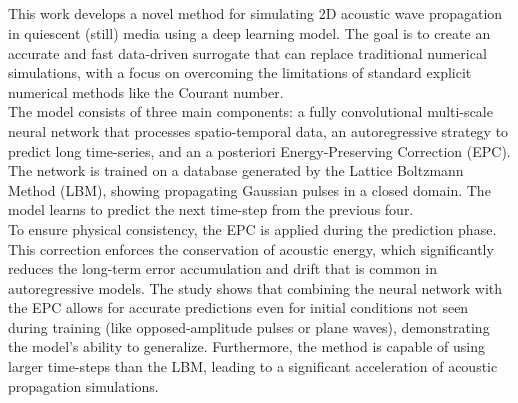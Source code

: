 		\subsection{}
			This work develops a novel method for simulating 2D acoustic wave propagation in quiescent (still) media using a deep learning model. The goal is to create an accurate and fast data-driven surrogate that can replace traditional numerical simulations, with a focus on overcoming the limitations of standard explicit numerical methods like the Courant number.\\
			The model consists of three main components: a fully convolutional multi-scale neural network that processes spatio-temporal data, an autoregressive strategy to predict long time-series, and an a posteriori Energy-Preserving Correction (EPC). The network is trained on a database generated by the Lattice Boltzmann Method (LBM), showing propagating Gaussian pulses in a closed domain. The model learns to predict the next time-step from the previous four.\\
			To ensure physical consistency, the EPC is applied during the prediction phase. This correction enforces the conservation of acoustic energy, which significantly reduces the long-term error accumulation and drift that is common in autoregressive models. The study shows that combining the neural network with the EPC allows for accurate predictions even for initial conditions not seen during training (like opposed-amplitude pulses or plane waves), demonstrating the model's ability to generalize. Furthermore, the method is capable of using larger time-steps than the LBM, leading to a significant acceleration of acoustic propagation simulations.
		\newpage

